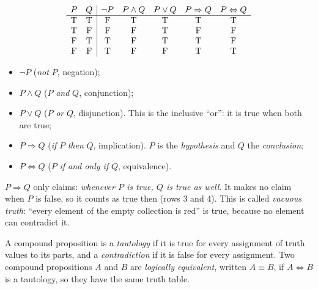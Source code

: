 \begin{definition}[Connectives]
\label{def:connectives}
\[
\begin{array}{cc|ccccc}
  P & Q & \lnot P & P \land Q & P \lor Q & P \Rightarrow Q & P \Leftrightarrow Q \\
  \hline
  \mathrm{T} & \mathrm{T} & \mathrm{F} & \mathrm{T} & \mathrm{T} & \mathrm{T} & \mathrm{T} \\
  \mathrm{T} & \mathrm{F} & \mathrm{F} & \mathrm{F} & \mathrm{T} & \mathrm{F} & \mathrm{F} \\
  \mathrm{F} & \mathrm{T} & \mathrm{T} & \mathrm{F} & \mathrm{T} & \mathrm{T} & \mathrm{F} \\
  \mathrm{F} & \mathrm{F} & \mathrm{T} & \mathrm{F} & \mathrm{F} & \mathrm{T} & \mathrm{T}
\end{array}
\]
\begin{itemize}
  \item $\lnot P$ (\emph{not} $P$, negation);
  \item $P \land Q$ ($P$ \emph{and} $Q$, conjunction);
  \item $P \lor Q$ ($P$ \emph{or} $Q$, disjunction). This is the inclusive
    \enquote{or}: it is true when both are true;
  \item $P \Rightarrow Q$ (\emph{if} $P$ \emph{then} $Q$, implication). $P$ is the
    \emph{hypothesis} and $Q$ the \emph{conclusion};
  \item $P \Leftrightarrow Q$ ($P$ \emph{if and only if} $Q$, equivalence).
\end{itemize}
\end{definition}

\begin{remark}
\label{rem:vacuous}
$P \Rightarrow Q$ only claims: \emph{whenever $P$ is true, $Q$ is true as well}.
It makes no claim when $P$ is false, so it counts as true then (rows 3 and 4).
This is called \emph{vacuous truth}: \enquote{every element of the empty
collection is red} is true, because no element can contradict it.
\end{remark}

\begin{definition}
\label{def:tautology}
A compound proposition is a \emph{tautology} if it is true for every assignment of
truth values to its parts, and a \emph{contradiction} if it is false for every
assignment. Two compound propositions $A$ and $B$ are \emph{logically
equivalent}, written $A \equiv B$, if $A \Leftrightarrow B$ is a tautology, so
they have the same truth table.
\end{definition}

